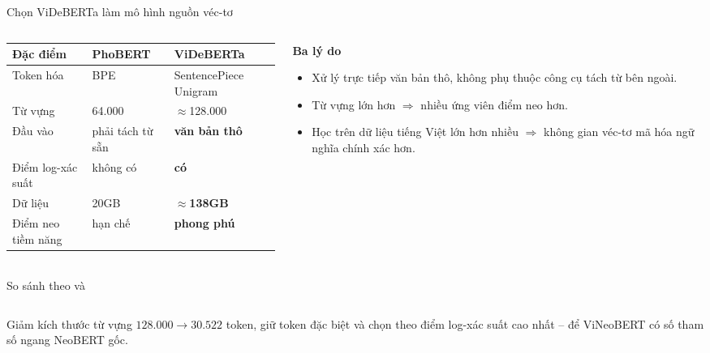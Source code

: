 \begin{frame}{Chọn ViDeBERTa làm mô hình nguồn véc-tơ}
\vspace{0.3em}
\begin{columns}[T]
\begin{column}{0.56\textwidth}
  \scriptsize
  \begin{tabular}{@{} L{2.3cm} L{2.2cm} L{2.7cm}@{}}
    \toprule
    \color{vnNavy}\bfseries Đặc điểm &
    \color{vnNavy}\bfseries PhoBERT &
    \color{vnNavy}\bfseries ViDeBERTa\\
    \midrule
    Token hóa      & BPE            & SentencePiece Unigram\\
    Từ vựng        & 64.000         & $\approx$128.000\\
    Đầu vào        & phải tách từ sẵn & \textbf{văn bản thô}\\
    Điểm log-xác suất & không có    & \textbf{có}\\
    Dữ liệu        & 20GB           & \textbf{$\approx$138GB}\\
    Điểm neo tiềm năng & hạn chế    & \textbf{phong phú}\\
    \bottomrule
  \end{tabular}
  \vspace{3pt}\\
  {\footnotesize\color{vnCite} So sánh theo \citet{Nguyen2020} và \citet{Tran2023}}
\end{column}

\begin{column}{0.42\textwidth}
  \textbf{Ba lý do}
  \begin{itemize}\itemsep2pt
    \item Xử lý trực tiếp văn bản thô, không phụ thuộc công cụ tách từ
          bên ngoài.
    \item Từ vựng lớn hơn $\Rightarrow$ nhiều ứng viên điểm neo hơn.
    \item Học trên dữ liệu tiếng Việt lớn hơn nhiều $\Rightarrow$ không gian
          véc-tơ mã hóa ngữ nghĩa chính xác hơn.
  \end{itemize}
\end{column}
\end{columns}

\vspace{0.7em}
\begin{columns}[T]
\begin{column}{0.95\textwidth}
  \begin{block}{Giảm kích thước từ vựng}
    \small $128.000 \rightarrow \mathbf{30.522}$ token, giữ token đặc biệt và
    chọn theo điểm log-xác suất cao nhất -- để ViNeoBERT có số tham số ngang
    NeoBERT gốc.
  \end{block}
\end{column}
\end{columns}
\end{frame}

